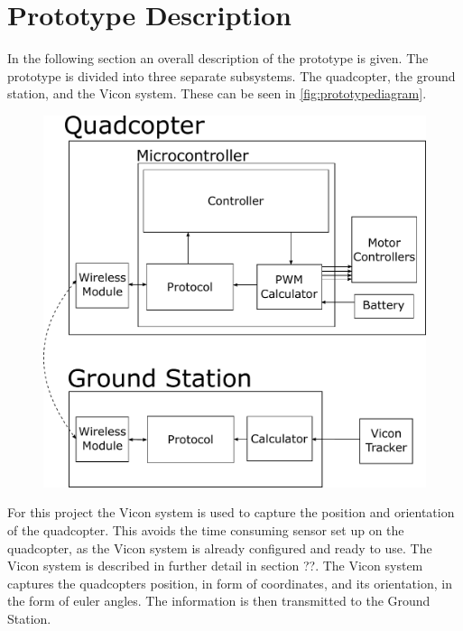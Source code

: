 \section{Prototype Description}
In the following section an overall description of the prototype is given. %
The prototype is divided into three separate subsystems. The quadcopter, the ground station, and the Vicon system. These can be seen in \autoref{fig:prototypediagram}. 

\begin{figure}[H] 
	\includegraphics[scale=.5]{figures/prototypediagram}
	\centering
	\captionsetup{justification=centering}
	\label{fig:prototypediagram}
\end{figure}


For this project the Vicon system is used to capture the position and orientation of the quadcopter. This avoids the time consuming sensor set up on the quadcopter, as the Vicon system is already configured and ready to use. The Vicon system is described in further detail in section ??. The Vicon system captures the quadcopters position, in form of coordinates, and its orientation, in the form of euler angles. The information is then transmitted to the Ground Station.

